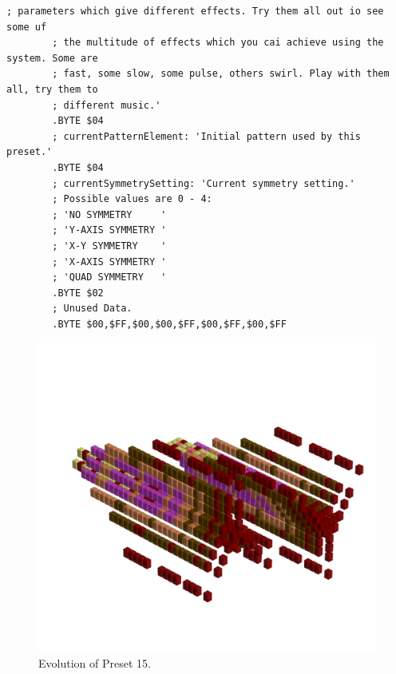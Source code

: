 \begin{lstlisting}[basicstyle=\ttfamily\tiny,caption=Source code for Preset 14.]
        ; parameters which give different effects. Try them all out io see some uf
        ; the multitude of effects which you cai achieve using the system. Some are
        ; fast, some slow, some pulse, others swirl. Play with them all, try them to
        ; different music.'
        .BYTE $04
        ; currentPatternElement: 'Initial pattern used by this preset.'
        .BYTE $04
        ; currentSymmetrySetting: 'Current symmetry setting.'
        ; Possible values are 0 - 4:
        ; 'NO SYMMETRY     '
        ; 'Y-AXIS SYMMETRY '
        ; 'X-Y SYMMETRY    '
        ; 'X-AXIS SYMMETRY '
        ; 'QUAD SYMMETRY   '
        .BYTE $02
        ; Unused Data.
        .BYTE $00,$FF,$00,$00,$FF,$00,$FF,$00,$FF
\end{lstlisting}


\clearpage                                                                 
\begin{figure}[H]                                                          
    \centering                                                             
    \begin{adjustbox}{width=14cm,center}                                   
      \includegraphics[width=14cm]{src/presets/pattern14-45.png}%
    \end{adjustbox}                                                        
\caption{Evolution of Preset 15.}                                           
\end{figure}                                                               
\clearpage                                                                 
                                                                           
